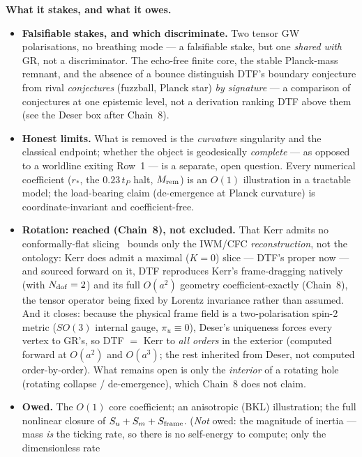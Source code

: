 \documentclass[11pt]{article}
\begin{document}
\begin{tcolorbox}
\textbf{What it stakes, and what it owes.}
\begin{itemize}[leftmargin=1.5em,itemsep=2pt,topsep=3pt]
  \item \textbf{Falsifiable stakes, and which discriminate.} Two tensor GW polarisations, no
    breathing mode --- a falsifiable stake, but one \emph{shared with} GR, not a discriminator. The
    echo-free finite core, the stable Planck-mass remnant, and the absence of a bounce distinguish DTF's
    boundary conjecture from rival \emph{conjectures} (fuzzball, Planck star) \emph{by signature} --- a
    comparison of conjectures at one epistemic level, not a derivation ranking DTF above them (see the Deser
    box after Chain~8).
  \item \textbf{Honest limits.} What is removed is the \emph{curvature} singularity and the classical
    endpoint; whether the object is geodesically \emph{complete} --- as opposed to a worldline exiting
    Row~1 --- is a separate, open question. Every numerical coefficient ($r_*$, the $0.23\,t_P$ halt,
    $M_{\rm rem}$) is an $O(1)$ illustration in a tractable model; the load-bearing claim (de-emergence at
    Planck curvature) is coordinate-invariant and coefficient-free.
  \item \textbf{Rotation: reached (Chain~8), not excluded.} That Kerr admits no conformally-flat
    slicing~\cite{GaratPrice2000} bounds only the IWM/CFC \emph{reconstruction}, not the ontology:
    Kerr does admit a maximal ($K=0$) slice --- DTF's
    proper now --- and sourced forward on it, DTF reproduces Kerr's frame-dragging natively (with $N_{\rm
    dof}=2$) and its full $O(a^2)$ geometry coefficient-exactly (Chain~8), the tensor operator being fixed by
    Lorentz invariance rather than assumed. And it closes: because the physical frame field is a
    two-polarisation spin-2 metric ($SO(3)$ internal gauge, $\pi_u\equiv0$), Deser's uniqueness forces every
    vertex to GR's, so DTF $=$ Kerr to \emph{all orders} in the exterior (computed forward at $O(a^2)$ and
    $O(a^3)$; the rest inherited from Deser, not computed order-by-order).
    What remains open is only the \emph{interior} of a rotating hole (rotating collapse / de-emergence),
    which Chain~8 does not claim.
  \item \textbf{Owed.} The $O(1)$ core coefficient; an anisotropic (BKL) illustration; the full nonlinear
    closure of $S_u+S_m+S_{\rm frame}$. (\emph{Not} owed: the magnitude of inertia ---
    mass \emph{is} the ticking rate, so there is no self-energy to compute; only the dimensionless rate

\end{itemize}
\end{tcolorbox}
\end{document}
